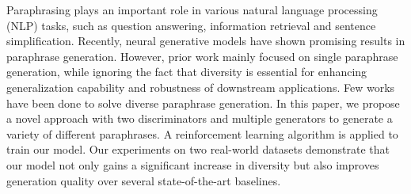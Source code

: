 Paraphrasing plays an important role in various natural language processing (NLP) tasks, such as question answering, information retrieval and sentence simpliﬁcation. Recently, neural generative models have shown promising results in paraphrase generation. However, prior work mainly focused on single paraphrase generation, while ignoring the fact that diversity is essential for enhancing generalization capability and robustness of downstream applications. Few works have been done to solve diverse paraphrase generation. In this paper, we propose a novel approach with two discriminators and multiple generators to generate a variety of different paraphrases. A reinforcement learning algorithm is applied to train our model. Our experiments on two real-world datasets demonstrate that our model not only gains a signiﬁcant increase in diversity but also improves generation quality over several state-of-the-art baselines.